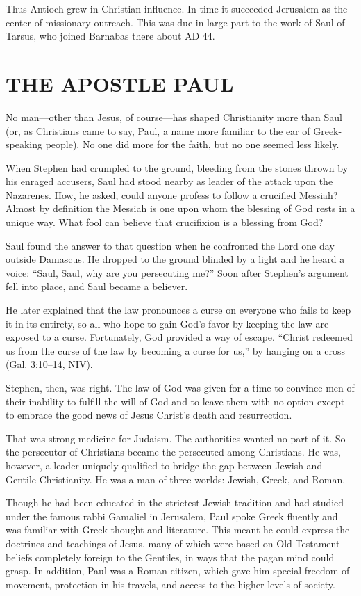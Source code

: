 Thus Antioch grew in Christian influence. In time it succeeded Jerusalem as the center of missionary
outreach. This was due in large part to the work of Saul of Tarsus, who joined Barnabas there about
AD 44.

\section{THE APOSTLE PAUL}

No man—other than Jesus, of course—has shaped Christianity more than Saul (or, as Christians came to
say, Paul, a name more familiar to the ear of Greek-speaking people). No one did more for the faith,
but no one seemed less likely.

When Stephen had crumpled to the ground, bleeding from the stones thrown by his enraged accusers,
Saul had stood nearby as leader of the attack upon the Nazarenes. How, he asked, could anyone
profess to follow a crucified Messiah? Almost by definition the Messiah is one upon whom the
blessing of God rests in a unique way. What fool can believe that crucifixion is a blessing from
God?

Saul found the answer to that question when he confronted the Lord one day outside Damascus. He
dropped to the ground blinded by a light and he heard a voice: “Saul, Saul, why are you persecuting
me?” Soon after Stephen’s argument fell into place, and Saul became a believer.

He later explained that the law pronounces a curse on everyone who fails to keep it in its entirety,
so all who hope to gain God’s favor by keeping the law are exposed to a curse. Fortunately, God
provided a way of escape. “Christ redeemed us from the curse of the law by becoming a curse for us,”
by hanging on a cross (Gal. 3:10–14, NIV).

Stephen, then, was right. The law of God was given for a time to convince men of their inability to
fulfill the will of God and to leave them with no option except to embrace the good news of Jesus
Christ’s death and resurrection.

That was strong medicine for Judaism. The authorities wanted no part of it. So the persecutor of
Christians became the persecuted among Christians. He was, however, a leader uniquely qualified to
bridge the gap between Jewish and Gentile Christianity. He was a man of three worlds: Jewish, Greek,
and Roman.

Though he had been educated in the strictest Jewish tradition and had studied under the famous rabbi
Gamaliel in Jerusalem, Paul spoke Greek fluently and was familiar with Greek thought and literature.
This meant he could express the doctrines and teachings of Jesus, many of which were based on Old
Testament beliefs completely foreign to the Gentiles, in ways that the pagan mind could grasp. In
addition, Paul was a Roman citizen, which gave him special freedom of movement, protection in his
travels, and access to the higher levels of society.

